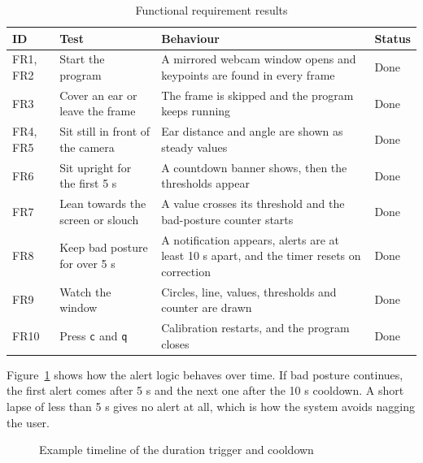﻿\documentclass[12pt,a4paper]{article}
\begin{document}
\begin{table}[htpb]
\centering
\caption{Functional requirement results}\label{tab:frres}
\footnotesize
\renewcommand{\arraystretch}{1.25}
\begin{tabularx}{\textwidth}{@{}l>{\raggedright\arraybackslash}p{3.4cm}Yl@{}}
\toprule
\textbf{ID} & \textbf{Test} & \textbf{Behaviour} & \textbf{Status}\\
\midrule
FR1, FR2 & Start the program & A mirrored webcam window opens and keypoints are found in every frame & Done\\
FR3 & Cover an ear or leave the frame & The frame is skipped and the program keeps running & Done\\
FR4, FR5 & Sit still in front of the camera & Ear distance and angle are shown as steady values & Done\\
FR6 & Sit upright for the first 5 s & A countdown banner shows, then the thresholds appear & Done\\
FR7 & Lean towards the screen or slouch & A value crosses its threshold and the bad-posture counter starts & Done\\
FR8 & Keep bad posture for over 5 s & A notification appears, alerts are at least 10 s apart, and the timer resets on correction & Done\\
FR9 & Watch the window & Circles, line, values, thresholds and counter are drawn & Done\\
FR10 & Press \texttt{c} and \texttt{q} & Calibration restarts, and the program closes & Done\\
\bottomrule
\end{tabularx}
\end{table}

Figure~\ref{fig:timeline} shows how the alert logic behaves over time. If bad posture
continues, the first alert comes after 5 s and the next one after the 10 s cooldown. A
short lapse of less than 5 s gives no alert at all, which is how the system avoids
nagging the user.

\begin{figure}[htpb]
    \centering
    \caption{Example timeline of the duration trigger and cooldown}
    \label{fig:timeline}
\end{figure}
\end{document}
